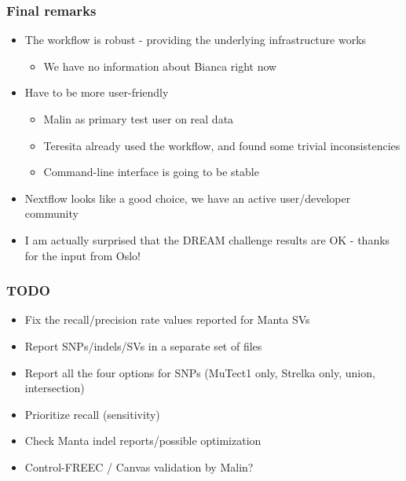 \documentclass{beamer}
\begin{document}
\begin{frame}
\frametitle{Final remarks}
    \begin{itemize}
	\item The workflow is robust - providing the underlying infrastructure works
            \begin{itemize} \item We have no information about Bianca right now \end{itemize}
	\item Have to be more user-friendly
            \begin{itemize} \item Malin as primary test user on real data \end{itemize}
            \begin{itemize} \item Teresita already used the workflow, and found some trivial inconsistencies \end{itemize}
            \begin{itemize} \item Command-line interface is going to be stable\end{itemize}
        \item Nextflow looks like a good choice, we have an active user/developer community
        \item I am actually surprised that the DREAM challenge results are OK - thanks for the input from Oslo!
    \end{itemize}
\end{frame}

\begin{frame}
\frametitle{TODO}
\begin{itemize}
	\item Fix the recall/precision rate values reported for Manta SVs
	\item Report SNPs/indels/SVs in a separate set of files
	\item Report all the four options for SNPs (MuTect1 only, Strelka only, union, intersection)
	\item Prioritize recall (sensitivity) 
	\item Check Manta indel reports/possible optimization
	\item Control-FREEC / Canvas validation by Malin?
\end{itemize}
\end{frame}
\end{document}
